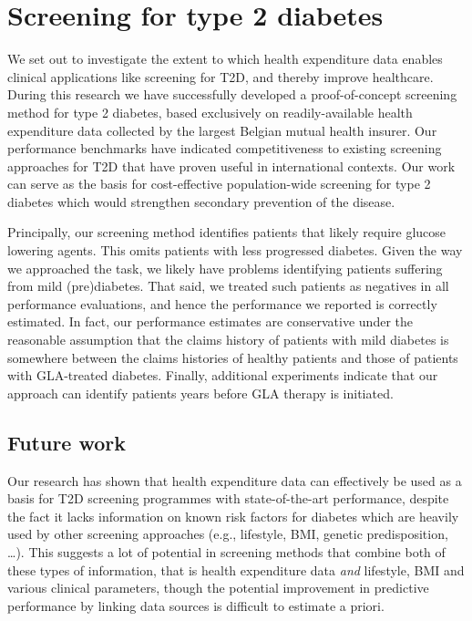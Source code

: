 \section{Screening for type 2 diabetes} \label{conclusion:screening}
We set out to investigate the extent to which health expenditure data enables clinical applications like screening for T2D, and thereby improve healthcare. During this research we have successfully developed a proof-of-concept screening method for type 2 diabetes, based exclusively on readily-available health expenditure data collected by the largest Belgian mutual health insurer. Our performance benchmarks have indicated competitiveness to existing screening approaches for T2D that have proven useful in international contexts. Our work can serve as the basis for cost-effective population-wide screening for type 2 diabetes which would strengthen secondary prevention of the disease.

Principally, our screening method identifies patients that likely require glucose lowering agents. This omits patients with less progressed diabetes. Given the way we approached the task, we likely have problems identifying patients suffering from mild (pre)diabetes. That said, we treated such patients as negatives in all performance evaluations, and hence the performance we reported is correctly estimated. In fact, our performance estimates are conservative under the reasonable assumption that the claims history of patients with mild diabetes is somewhere between the claims histories of healthy patients and those of patients with GLA-treated diabetes. Finally, additional experiments indicate that our approach can identify patients years before GLA therapy is initiated.

\subsection{Future work} 

Our research has shown that health expenditure data can effectively be used as a basis for T2D screening programmes with state-of-the-art performance, despite the fact it lacks information on known risk factors for diabetes which are heavily used by other screening approaches (e.g., lifestyle, BMI, genetic predisposition, \ldots). This suggests a lot of potential in screening methods that combine both of these types of information, that is health expenditure data \emph{and} lifestyle, BMI and various clinical parameters, though the potential improvement in predictive performance by linking data sources is difficult to estimate a priori. 

